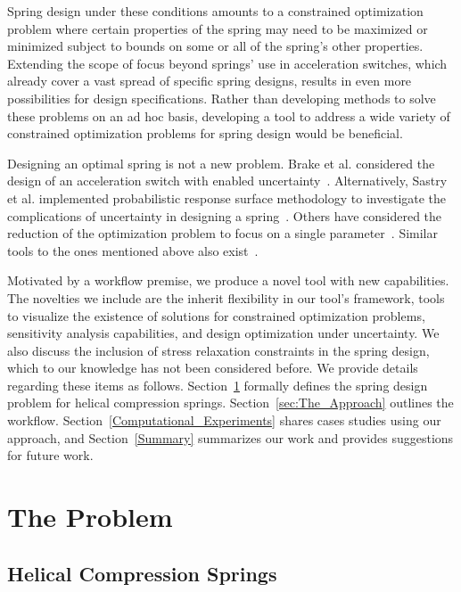 \documentclass[10pt]{article}
\begin{document}
Spring design under these conditions amounts to a constrained optimization problem where certain properties of the spring may need to be maximized or minimized subject to bounds on some or all of the spring's other properties. Extending the scope of focus beyond springs' use in acceleration switches, which already cover a vast spread of specific spring designs, results in even more possibilities for design specifications. Rather than developing methods to solve these problems on an ad hoc basis, developing a tool to address a wide variety of constrained optimization problems for spring design would be beneficial. 

Designing an optimal spring is not a new problem. Brake et al. considered the design of an acceleration switch with enabled uncertainty~\cite{IMSM2010}. Alternatively, Sastry et al. implemented probabilistic response surface methodology to investigate the complications of uncertainty in designing a spring~\cite{Reliability}. Others have considered the reduction of the optimization problem to focus on a single parameter~\cite{Robust}. Similar tools to the ones mentioned above also exist~\cite{Paredes}.

Motivated by a workflow premise, we produce a novel tool with new capabilities. The novelties we include are the inherit flexibility in our tool's framework, tools to visualize the existence of solutions for constrained optimization problems, sensitivity analysis capabilities, and design optimization under uncertainty. We also discuss the inclusion of stress relaxation constraints in the spring design, which to our knowledge has not been considered before. We provide details regarding these items as follows. Section~\ref{sec:The_Problem} formally defines the spring design problem for helical compression springs. Section~\ref{sec:The_Approach} outlines the workflow. Section~\ref{Computational_Experiments} shares cases studies using our approach, and Section~\ref{Summary} summarizes our work and provides suggestions for future work.

			
\section{The Problem} 
\label{sec:The_Problem}

\subsection{Helical Compression Springs}
\label{sec:Springs}
\end{document}
